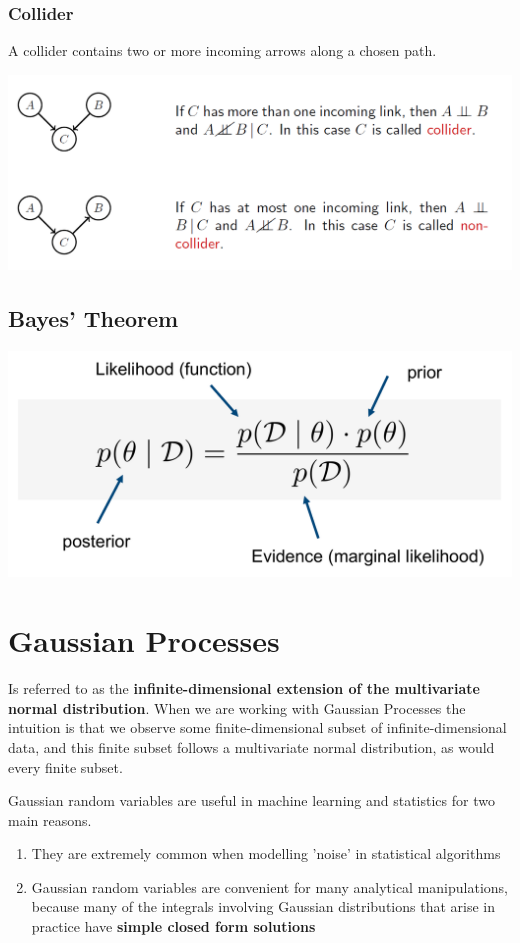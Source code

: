 \documentclass[11pt]{article}
\theoremstyle{definition}
\begin{document}
\subsubsection{Collider}
A collider contains two or more incoming arrows along a chosen path.
\begin{center}
	\includegraphics[width=0.8\linewidth]{img/conditional_independence_collider}
\end{center}

\subsection{Bayes' Theorem}
\begin{center}
	\includegraphics[width=0.6\linewidth]{img/bayes_theorem}
\end{center}

\section{Gaussian Processes}
Is referred to as the \textbf{infinite-dimensional extension of the multivariate normal distribution}. When we are working with Gaussian Processes the intuition is that we observe some finite-dimensional subset of infinite-dimensional data, and this finite subset follows a multivariate normal distribution, as would every finite subset.

Gaussian random variables are useful in machine learning and statistics for two main reasons.
\begin{enumerate}
	\item They are extremely common when modelling 'noise' in statistical algorithms
	\item Gaussian random variables are convenient for many analytical manipulations, because many of the integrals involving Gaussian distributions that arise in practice have \textbf{simple closed form solutions}
\end{enumerate}
\end{document}
